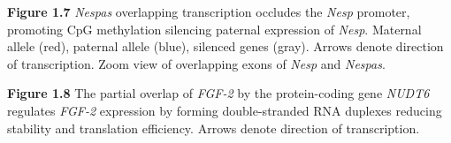 \documentclass{beamer}
\begin{document}
\begin{frame}
  
  \begin{block}{\textbf{Figure 1.7}}
    \emph{Nespas} overlapping transcription occludes the \emph{Nesp} promoter, promoting CpG methylation silencing paternal expression of \emph{Nesp}. Maternal allele (red), paternal allele (blue), silenced genes (gray). Arrows denote direction of transcription. Zoom view of overlapping exons of \emph{Nesp} and \emph{Nespas}.
  \end{block}
\end{frame}

\begin{frame}
  \begin{block}{\textbf{Figure 1.8}}
    The partial overlap of \emph{FGF-2} by the protein-coding gene \emph{NUDT6} regulates \emph{FGF-2} expression by forming double-stranded RNA duplexes reducing stability and translation efficiency. Arrows denote direction of transcription.
  \end{block}
\end{frame}
\end{document}
